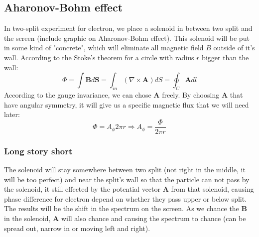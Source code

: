 \documentclass[unnumsec,webpdf,modern,large]{mam-authoring-template}%
\theoremstyle{thmstyleone}%
\theoremstyle{thmstyletwo}%
\theoremstyle{thmstylethree}%
\begin{document}
\begin{appendices}
\subsection{Aharonov-Bohm effect}
\quad In two-split experiment for electron, we place a solenoid in between two split and the screen (include graphic on Aharonov-Bohm effect). This solenoid will be put in some kind of "concrete", which will eliminate all magnetic field \(B\) outside of it's wall. According to the Stoke's theorem for a circle with radius \(r\) bigger than the wall:
\begin{equation}
	\Phi = \int \textbf{B} d\textbf{S} = \int_{in} (\nabla \times \textbf{A}) dS = \oint_C \textbf{A} dl
\end{equation}
\quad According to the gauge invariance, we can chose \(\textbf{A}\) freely. By choosing \(\textbf{A}\) that have angular symmetry, it will give us a specific magnetic flux that we will need later:
\begin{equation}\label{solenoid gauge}
	\Phi = A_{\phi} 2\pi r \Rightarrow A_{\phi} = \frac{\Phi}{2\pi r}
\end{equation}
\subsubsection{Long story short}
\quad The solenoid will stay somewhere between two split (not right in the middle, it will be too perfect) and near the split's wall so that the particle can not pass by the solenoid, it still effected by the potential vector \(\textbf{A}\) from that solenoid, causing phase difference for electron depend on whether they pass upper or below split. The results will be the shift in the spectrum on the screen. As we chance the \(\textbf{B}\) in the solenoid, \(\textbf{A}\) will also chance and causing the spectrum to chance (can be spread out, narrow in or moving left and right).

\end{appendices}
\end{document}
